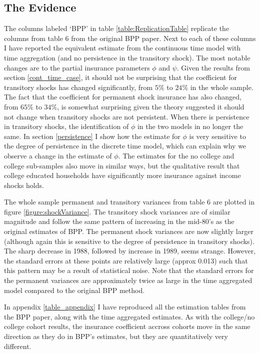 \subsection{The Evidence} \label{evidence}
The columns labeled `BPP' in table \ref{table:ReplicationTable} replicate the columns from table 6 from the original BPP paper. Next to each of these columns I have reported the equivalent estimate from the continuous time model with time aggregation (and no persistence in the transitory shock). The most notable changes are to the partial insurance parameters $\phi$ and $\psi$. Given the results from section \ref{cont_time_case}, it should not be surprising that the coefficient for transitory shocks has changed significantly, from $5\%$ to $24\%$ in the whole sample. The fact that the coefficient for permanent shock insurance has also changed, from $65\%$ to $34\%$, is somewhat surprising given the theory suggested it should not change when transitory shocks are not persistent. When there is persistence in transitory shocks, the identification of $\phi$ in the two models in no longer the same. In section \ref{persistence} I show how the estimate for $\phi$ is very sensitive to the degree of persistence in the discrete time model, which can explain why we observe a change in the estimate of $\phi$. The estimates for the no college and college sub-samples also move in similar ways, but the qualitative result that college educated households have significantly more insurance against income shocks holds.

The whole sample permanent and transitory variances from table 6 are plotted in figure \ref{figure:shockVariance}. The transitory shock variances are of similar magnitude and follow the same pattern of increasing in the mid-80's as the original estimates of BPP. The permanent shock variances are now slightly larger (although again this is sensitive to the degree of persistence in transitory shocks). The sharp decrease in 1988, followed by increase in 1989, seems strange. However, the standard errors at these points are relatively large (approx 0.013) such that this pattern may be a result of statistical noise. Note that the standard errors for the permanent variances are approximately twice as large in the time aggregated model compared to the original BPP method.

In appendix \ref{table_appendix} I have reproduced all the estimation tables from the BPP paper, along with the time aggregated estimates. As with the college/no college cohort results, the insurance coefficient accross cohorts move in the same direction as they do in BPP's estimates, but they are quantitatively very different.

